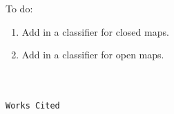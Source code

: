 \documentclass{book}
\theoremstyle{definition}
\newtheorem{theorem}{Theorem}
\begin{document}
{{To do:
\begin{enumerate}
\item Add in a classifier for closed maps.
\item Add in a classifier for open maps.
\end{enumerate}

\fi


\newpage
{
\Huge 
\begin{center}
\ \\
\ \\
\texttt{Works Cited}
\ \\
\ \\
\end{center}
\thispagestyle{empty}
}

}}
\end{document}
